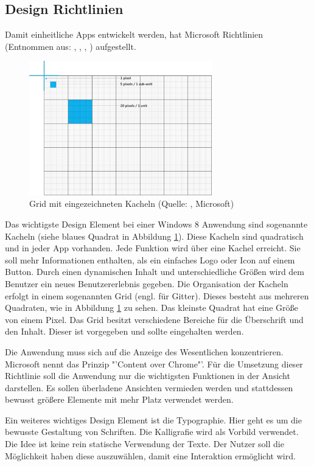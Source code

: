 \subsection{Design Richtlinien}
Damit einheitliche Apps entwickelt werden, hat Microsoft Richtlinien (Entnommen aus: \cite{bib:win80}, \cite{bib:win81}, \cite{bib:win82}, \cite{bib:win83}) aufgestellt. \par
\begin{figure}[H]
\centering
\includegraphics[width=300px]{images/grid}
\caption{Grid mit eingezeichneten Kacheln (Quelle: \cite{bib:gridTile}, Microsoft)}
\label{gridAndTile}
\end{figure}
Das wichtigste Design Element bei einer Windows 8 Anwendung sind sogenannte Kacheln (siehe blaues Quadrat in Abbildung \ref{gridAndTile}). Diese Kacheln sind quadratisch und in jeder App vorhanden. Jede Funktion wird über eine Kachel erreicht. Sie soll mehr Informationen enthalten, als ein einfaches Logo oder Icon auf einem Button. Durch einen dynamischen Inhalt und unterschiedliche Größen wird dem Benutzer ein neues Benutzererlebnis gegeben. Die Organisation der Kacheln erfolgt in einem sogenannten Grid (engl. für Gitter). Dieses besteht aus mehreren Quadraten, wie in Abbildung \ref{gridAndTile} zu sehen. Das kleinste Quadrat hat eine Größe von einem Pixel. Das Grid besitzt verschiedene Bereiche für die Überschrift und den Inhalt. Dieser ist vorgegeben und sollte eingehalten werden. \par 

Die Anwendung muss sich auf die Anzeige des Wesentlichen konzentrieren. Microsoft nennt  das Prinzip "'Content over Chrome"'.  Für die Umsetzung dieser Richtlinie soll die Anwendung nur die wichtigsten Funktionen in der Ansicht darstellen. Es sollen überladene Ansichten vermieden werden und stattdessen bewusst größere Elemente mit mehr Platz verwendet werden. 
 
Ein weiteres wichtiges Design Element ist die Typographie. Hier geht es um die bewusste Gestaltung von Schriften. Die Kalligrafie wird als Vorbild verwendet.  Die Idee ist keine rein statische Verwendung der Texte. Der Nutzer soll die Möglichkeit haben diese auszuwählen, damit eine Interaktion ermöglicht wird. 

